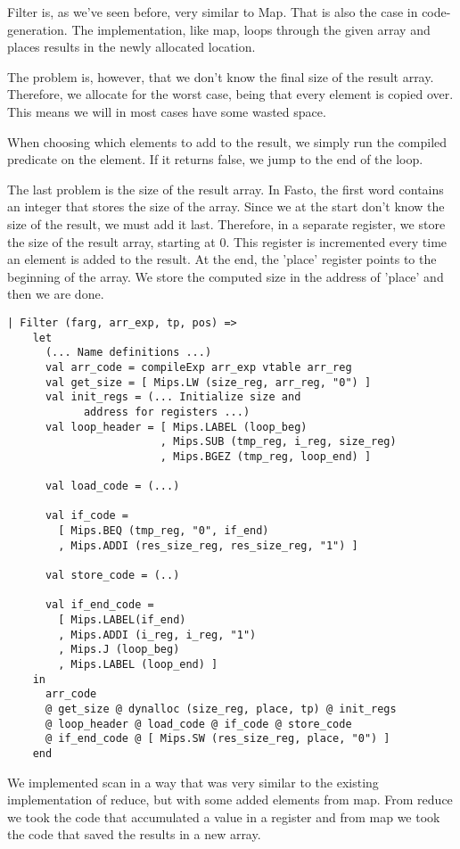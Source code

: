 \documentclass[10pt]{article}
\begin{document}
Filter is, as we've seen before, very similar to Map. That is also the case in code-generation. The implementation, like map, loops through the given array and places results in the newly allocated location.

The problem is, however, that we don't know the final size of the result array. Therefore, we allocate for the worst case, being that every element is copied over. This means we will in most cases have some wasted space.

When choosing which elements to add to the result, we simply run the compiled predicate on the element. If it returns false, we jump to the end of the loop.

The last problem is the size of the result array. In Fasto, the first word contains an integer that stores the size of the array. Since we at the start don't know the size of the result, we must add it last. Therefore, in a separate register, we store the size of the result array, starting at 0. This register is incremented every time an element is added to the result. At the end, the 'place' register points to the beginning of the array. We store the computed size in the address of 'place' and then we are done.

\begin{Verbatim}[frame=single]
  | Filter (farg, arr_exp, tp, pos) =>
    let
      (... Name definitions ...)
      val arr_code = compileExp arr_exp vtable arr_reg
      val get_size = [ Mips.LW (size_reg, arr_reg, "0") ]
      val init_regs = (... Initialize size and 
      		address for registers ...)
      val loop_header = [ Mips.LABEL (loop_beg)
                        , Mips.SUB (tmp_reg, i_reg, size_reg)
                        , Mips.BGEZ (tmp_reg, loop_end) ]
  
      val load_code = (...)
  
      val if_code =
        [ Mips.BEQ (tmp_reg, "0", if_end)
        , Mips.ADDI (res_size_reg, res_size_reg, "1") ]
  
      val store_code = (..)
      			  
      val if_end_code =
        [ Mips.LABEL(if_end)
        , Mips.ADDI (i_reg, i_reg, "1")
        , Mips.J (loop_beg)
        , Mips.LABEL (loop_end) ]
    in
      arr_code
      @ get_size @ dynalloc (size_reg, place, tp) @ init_regs
      @ loop_header @ load_code @ if_code @ store_code
      @ if_end_code @ [ Mips.SW (res_size_reg, place, "0") ]
    end
\end{Verbatim}

We implemented scan in a way that was very similar to the existing implementation of reduce, but with some added elements from map. From reduce we took the code that accumulated a value in a register and from map we took the code that saved the results in a new array.
\end{document}
